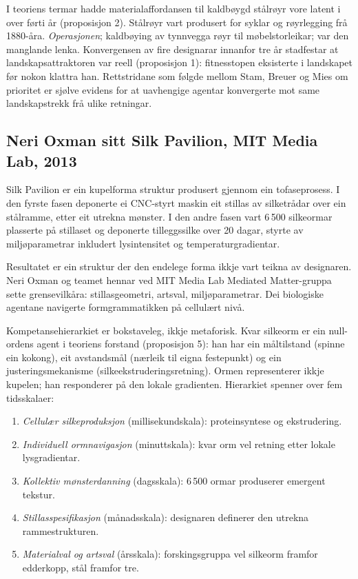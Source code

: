I teoriens termar hadde materialaffordansen til kaldbøygd stålrøyr vore latent i over førti år (proposisjon 2). Stålrøyr vart produsert for syklar og røyrlegging frå 1880-åra. \textit{Operasjonen}; kaldbøying av tynnvegga røyr til møbelstorleikar; var den manglande lenka. Konvergensen av fire designarar innanfor tre år stadfestar at landskapsattraktoren var reell (proposisjon 1): fitnesstopen eksisterte i landskapet før nokon klattra han. Rettstridane som følgde mellom Stam, Breuer og Mies om prioritet er sjølve evidens for at uavhengige agentar konvergerte mot same landskapstrekk frå ulike retningar.

\subsection{Neri Oxman sitt Silk Pavilion, MIT Media Lab, 2013}

Silk Pavilion er ein kupelforma struktur produsert gjennom ein tofaseprosess. I den fyrste fasen deponerte ei CNC-styrt maskin eit stillas av silketrådar over ein stålramme, etter eit utrekna mønster. I den andre fasen vart 6\,500 silkeormar plasserte på stillaset og deponerte tilleggssilke over 20 dagar, styrte av miljøparametrar inkludert lysintensitet og temperaturgradi\-entar.

Resultatet er ein struktur der den endelege forma ikkje vart teikna av designaren. Neri Oxman og teamet hennar ved MIT Media Lab Mediated Matter-gruppa sette grensevilkåra: stillasgeometri, artsval, miljøparametrar. Dei biologiske agentane navigerte formgrammatikken på cellulært nivå.

Kompetansehierarkiet er bokstaveleg, ikkje metaforisk. Kvar silkeorm er ein null-ordens agent i teoriens forstand (proposisjon 5): han har ein måltilstand (spinne ein kokong), eit avstandsmål (nærleik til eigna festepunkt) og ein justeringsmekanisme (silkeekstruderingsretning). Ormen representerer ikkje kupelen; han responderer på den lokale gradienten. Hierarkiet spenner over fem tidsskalaer:

\begin{enumerate}
\item \textit{Cellulær silkeproduksjon} (millisekundskala): proteinsyntese og ekstrudering.
\item \textit{Individuell ormnavigasjon} (minuttskala): kvar orm vel retning etter lokale lysgradi\-entar.
\item \textit{Kollektiv mønsterdanning} (dagsskala): 6\,500 ormar produserer emergent tekstur.
\item \textit{Stillasspesifikasjon} (månadsskala): designaren definerer den utrekna rammestrukturen.
\item \textit{Materialval og artsval} (årsskala): forskingsgruppa vel silkeorm framfor edderkopp, stål framfor tre.
\end{enumerate}

